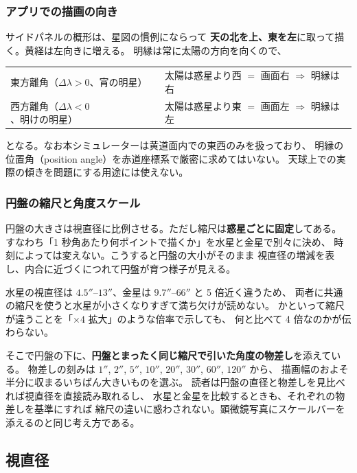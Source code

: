 \documentclass[a4paper,11pt]{ltjsarticle}
\begin{document}
\subsubsection*{アプリでの描画の向き}

サイドパネルの概形は、星図の慣例にならって
\textbf{天の北を上、東を左}に取って描く。黄経は左向きに増える。
明縁は常に太陽の方向を向くので、

\begin{center}
\begin{tabular}{ll}
  \toprule
  東方離角（$\Delta\lambda>0$、宵の明星） & 太陽は惑星より西 $=$ 画面右 $\Rightarrow$ 明縁は右\\
  西方離角（$\Delta\lambda<0$、明けの明星） & 太陽は惑星より東 $=$ 画面左 $\Rightarrow$ 明縁は左\\
  \bottomrule
\end{tabular}
\end{center}

となる。なお本シミュレーターは黄道面内での東西のみを扱っており、
明縁の位置角（position angle）を赤道座標系で厳密に求めてはいない。
天球上での実際の傾きを問題にする用途には使えない。

\subsubsection*{円盤の縮尺と角度スケール}

円盤の大きさは視直径に比例させる。ただし縮尺は\textbf{惑星ごとに固定}してある。
すなわち「1 秒角あたり何ポイントで描くか」を水星と金星で別々に決め、
時刻によっては変えない。こうすると円盤の大小がそのまま
視直径の増減を表し、内合に近づくにつれて円盤が育つ様子が見える。

水星の視直径は $4.5''$--$13''$、金星は $9.7''$--$66''$ と 5 倍近く違うため、
両者に共通の縮尺を使うと水星が小さくなりすぎて満ち欠けが読めない。
かといって縮尺が違うことを「$\times 4$ 拡大」のような倍率で示しても、
何と比べて 4 倍なのかが伝わらない。

そこで円盤の下に、\textbf{円盤とまったく同じ縮尺で引いた角度の物差し}を添えている。
物差しの刻みは $1''$, $2''$, $5''$, $10''$, $20''$, $30''$, $60''$, $120''$ から、
描画幅のおよそ半分に収まるいちばん大きいものを選ぶ。
読者は円盤の直径と物差しを見比べれば視直径を直接読み取れるし、
水星と金星を比較するときも、それぞれの物差しを基準にすれば
縮尺の違いに惑わされない。顕微鏡写真にスケールバーを添えるのと同じ考え方である。

\subsection{視直径}
\end{document}
